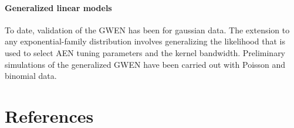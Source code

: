\documentclass[authoryear, review, 11pt]{elsarticle}
\begin{document}
	\paragraph{Generalized linear models} To date, validation of the GWEN has been for gaussian data. The extension to any exponential-family distribution involves generalizing the likelihood that is used to select AEN tuning parameters and the kernel bandwidth. Preliminary simulations of the generalized GWEN have been carried out with Poisson and binomial data.

\section{References}


\end{document}
